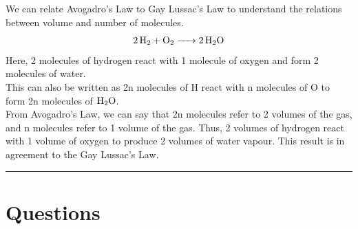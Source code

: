 \documentclass[
  14pt,
]{extarticle}
\renewenvironment{quote}{\begin{myquote}}{\end{myquote}}
\begin{document}
\begin{quote}
We can relate Avogadro's Law to Gay Lussac's Law to understand the
relations between volume and number of molecules.
\[\ce{2H2 + O2 -> 2H2O}\] Here, 2 molecules of hydrogen react with 1
molecule of oxygen and form 2 molecules of water.\\
This can also be written as 2n molecules of H react with n molecules of
O to form 2n molecules of \(\ce{H2O}\).\\
From Avogadro's Law, we can say that 2n molecules refer to 2 volumes of
the gas, and n molecules refer to 1 volume of the gas. Thus, 2 volumes
of hydrogen react with 1 volume of oxygen to produce 2 volumes of water
vapour. This result is in agreement to the Gay Lussac's Law.
\end{quote}

\begin{center}\rule{0.5\linewidth}{0.5pt}\end{center}

\hypertarget{questions}{%
\section{Questions}\label{questions}}
\end{document}
